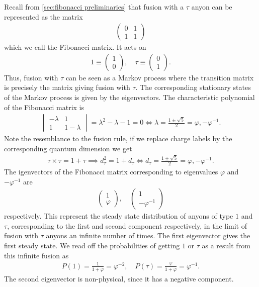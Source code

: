 Recall from \cref{sec:fibonacci preliminaries} that fusion with a $\tau$ anyon can be represented as the matrix
\begin{align}
  \begin{pmatrix}
    0 & 1 \\
    1 & 1
  \end{pmatrix}
\end{align}
which we call the Fibonacci matrix. It acts on
\begin{align}
  1 \equiv \begin{pmatrix} 1 \\ 0 \end{pmatrix}, \quad \tau \equiv \begin{pmatrix} 0 \\ 1 \end{pmatrix}.
\end{align}
Thus, fusion with $τ$ can be seen as a Markov process where the transition matrix is precisely the matrix giving fusion with $τ$. The corresponding stationary states of the Markov process is given by the eigenvectors. The characteristic polynomial of the Fibonacci matrix is
\begin{align}
  \begin{vmatrix}
    -λ & 1 \\
    1 & 1-λ
  \end{vmatrix} =
  λ^2-λ-1 = 0 \iff \lambda = \frac{1±\sqrt{5}}{2} = φ, -φ^{-1}.
\end{align}
Note the resemblance to the fusion rule, if we replace charge labels by the corresponding quantum dimension we get
\begin{align}
  τ × τ = 1 + τ \implies d_τ^2 = 1 + d_τ \iff d_τ = \frac{1±\sqrt{5}}{2} = φ, -φ^{-1}.
\end{align}
The igenvectors of the Fibonacci matrix corresponding to eigenvalues $φ$ and $-φ^{-1}$ are
\begin{align}
  \begin{pmatrix}
    1 \\ φ
  \end{pmatrix}, \quad
  \begin{pmatrix}
    1 \\ -φ^{-1}
  \end{pmatrix}
\end{align}
respectively. This represent the steady state distribution of anyons of type $1$ and $τ$, corresponding to the first and second component respectively, in the limit of fusion with $\tau$ anyons an infinite number of times. The first eigenvector gives the first steady state. We read off the probabilities of getting $1$ or $\tau$ as a result from this infinite fusion as
\begin{align}
  P(1) = \frac{1}{1+φ} = φ^{-2}, \quad
  P(τ) = \frac{φ}{1+φ} = φ^{-1}.
\end{align}
The second eigenvector is non-physical, since it has a negative component.

